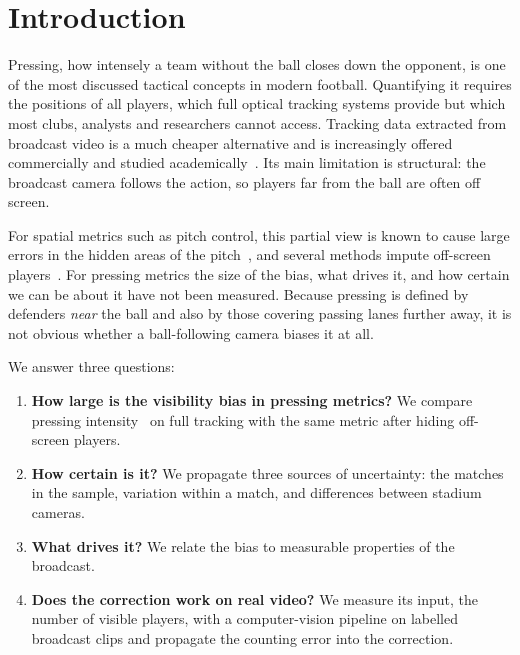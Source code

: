 \documentclass[runningheads]{llncs}
\begin{document}
\section{Introduction}

Pressing, how intensely a team without the ball closes down the opponent, is one of the most discussed tactical
concepts in modern football. Quantifying it requires the positions of all players, which full optical tracking
systems provide but which most clubs, analysts and researchers cannot access. Tracking data extracted from
broadcast video is a much cheaper alternative and is increasingly offered commercially and studied
academically~\cite{somers2024gsr,smf2025broadcast}. Its main limitation is structural: the broadcast camera follows
the action, so players far from the ball are often off screen.

For spatial metrics such as pitch control, this partial view is known to cause large errors in the hidden areas of
the pitch~\cite{offscreen2026}, and several methods impute off-screen
players~\cite{omidshafiei2022graphimputer,rsos2025continuous,offscreen2026}. For pressing metrics the size of the bias, what drives it, and how certain we can
be about it have not been measured. Because pressing is defined by defenders \emph{near} the ball and also by those
covering passing lanes further away, it is not obvious whether a ball-following camera biases it at all.

We answer three questions:
\begin{enumerate}
\item \textbf{How large is the visibility bias in pressing metrics?} We compare pressing intensity~\cite{bekkers2025pressing}
on full tracking with the same metric after hiding off-screen players.
\item \textbf{How certain is it?} We propagate three sources of uncertainty: the matches in the sample, variation within
a match, and differences between stadium cameras.
\item \textbf{What drives it?} We relate the bias to measurable properties of the broadcast.
\item \textbf{Does the correction work on real video?} We measure its input, the number of visible players, with a
computer-vision pipeline on labelled broadcast clips and propagate the counting error into the correction.
\end{enumerate}
\end{document}
